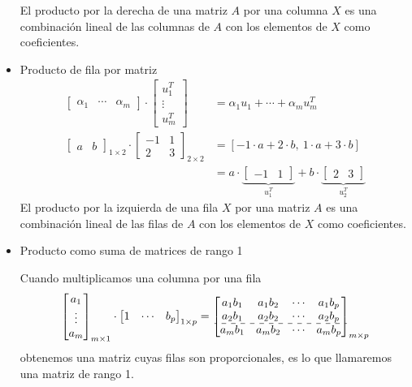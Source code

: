 \begin{itemize}[label=\color{lightblue}$-$, leftmargin=*]
El producto por la derecha de una matriz $A$ por una columna $X$ es una combinación lineal de las columnas de $A$ con los elementos de $X$ como coeficientes. 
\item Producto de fila por matriz
\[ \begin{aligned}
	\begin{bmatrix}
		\alpha_1 & \cdots & \alpha_m
	\end{bmatrix}\cdot\begin{bmatrix}
	u_1^T\\
	\vdots\\
	u_m^T
	\end{bmatrix} & =\alpha_1u_1+\cdots+\alpha_mu_m^T\\
	\begin{bmatrix}
		a & b
	\end{bmatrix}_{1\times2}\cdot\begin{bmatrix}
	-1 & 1\\
	2 & 3
	\end{bmatrix}_{2\times2} & =[-1\cdot a+2\cdot b,\: 1\cdot a+3\cdot b]\\
	 & =a\cdot\underbrace{\begin{bmatrix}
	 		-1 & 1
	 \end{bmatrix}}_{u_1^T}+b\cdot\underbrace{\begin{bmatrix}
	 2 & 3
 \end{bmatrix}}_{u_2^T}
\end{aligned} \]
El producto por la izquierda de una fila $X$ por una matriz $A$ es una combinación lineal de las filas de $A$ con los elementos de $X$ como coeficientes.
\item Producto como suma de matrices de rango 1

Cuando multiplicamos una columna por una fila \[ \begin{bmatrix}
	a_1\\
	\vdots\\
	a_m
\end{bmatrix}_{m\times1}\cdot\begin{bmatrix}
1 & \cdots & b_p
\end{bmatrix}_{1\times p}=\begin{bmatrix}
a_1b_1 & a_1b_2 & \cdots & a_1b_p \\
a_2b_1 & a_2b_2 & \cdots & a_2b_p \\ \hdashline
a_mb_1 & a_mb_2 & \cdots & a_mb_p
\end{bmatrix}_{m\times p} \] obtenemos una matriz cuyas filas son proporcionales, es lo que llamaremos una matriz de rango 1.
\end{itemize}
